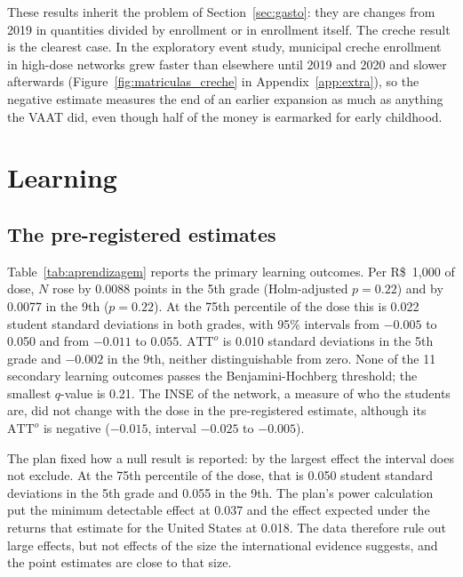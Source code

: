 \documentclass[12pt,letterpaper]{article}
\newcommand{\reais}{R\$}
\begin{document}
\begin{table}[!htbp]
\centering
\caption{Spending by stage and school inputs (S2)}\label{tab:insumos}
\small

\end{table}

These results inherit the problem of Section~\ref{sec:gasto}: they are changes from 2019 in quantities divided by enrollment or in enrollment itself. The creche result is the clearest case. In the exploratory event study, municipal creche enrollment in high-dose networks grew faster than elsewhere until 2019 and 2020 and slower afterwards (Figure~\ref{fig:matriculas_creche} in Appendix~\ref{app:extra}), so the negative estimate measures the end of an earlier expansion as much as anything the VAAT did, even though half of the money is earmarked for early childhood.

\section{Learning}\label{sec:aprendizagem}

\subsection{The pre-registered estimates}

Table~\ref{tab:aprendizagem} reports the primary learning outcomes. Per \reais{}~1,000 of dose, $N$ rose by 0.0088 points in the 5th grade (Holm-adjusted $p=0.22$) and by 0.0077 in the 9th ($p=0.22$). At the 75th percentile of the dose this is 0.022 student standard deviations in both grades, with 95\% intervals from $-0.005$ to 0.050 and from $-0.011$ to 0.055. $\text{ATT}^o$ is 0.010 standard deviations in the 5th grade and $-0.002$ in the 9th, neither distinguishable from zero. None of the 11 secondary learning outcomes passes the Benjamini-Hochberg threshold; the smallest $q$-value is 0.21. The INSE of the network, a measure of who the students are, did not change with the dose in the pre-registered estimate, although its $\text{ATT}^o$ is negative ($-0.015$, interval $-0.025$ to $-0.005$).

\begin{table}[!htbp]
\centering
\caption{Learning (P2 and S1)}\label{tab:aprendizagem}
\small

\end{table}

The plan fixed how a null result is reported: by the largest effect the interval does not exclude. At the 75th percentile of the dose, that is 0.050 student standard deviations in the 5th grade and 0.055 in the 9th. The plan's power calculation put the minimum detectable effect at 0.037 and the effect expected under the returns that \citet{jackson2024} estimate for the United States at 0.018. The data therefore rule out large effects, but not effects of the size the international evidence suggests, and the point estimates are close to that size.
\end{document}
